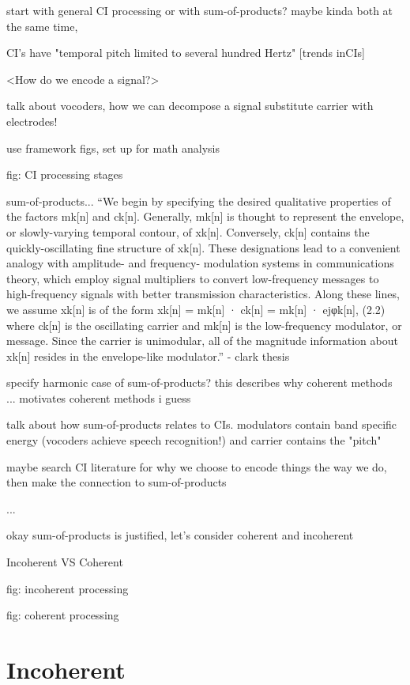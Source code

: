 \documentclass [11pt, proquest] {uwthesis}[2015/03/03]
\begin{document}
start with general CI processing or with sum-of-products?
maybe kinda both at the same time,

CI's have "temporal pitch limited to several hundred Hertz" [trends inCIs]

<How do we encode a signal?>

talk about vocoders, how we can decompose a signal
substitute carrier with electrodes!

use framework figs, set up for math analysis

fig: CI processing stages

sum-of-products...
``We begin by specifying the desired qualitative properties of the factors mk[n] and ck[n]. Generally, mk[n] is thought to represent the envelope, or slowly-varying temporal contour, of xk[n]. Conversely, ck[n] contains the quickly-oscillating fine structure of xk[n]. These designations lead to a convenient analogy with amplitude- and frequency- modulation systems in communications theory, which employ signal multipliers to convert low-frequency messages to high-frequency signals with better transmission characteristics. Along these lines, we assume xk[n] is of the form
xk[n] = mk[n] · ck[n] = mk[n] · ejφk[n], (2.2)
where ck[n] is the oscillating carrier and mk[n] is the low-frequency modulator, or message. Since the carrier is unimodular, all of the magnitude information about xk[n] resides in the envelope-like modulator.'' - clark thesis

specify harmonic case of sum-of-products? this describes why coherent methods ... motivates coherent methods i guess

talk about how sum-of-products relates to CIs.  modulators contain band specific energy (vocoders achieve speech recognition!) and carrier contains the "pitch"

maybe search CI literature for why we choose to encode things the way we do, then make the connection to sum-of-products

...

okay sum-of-products is justified, let's consider coherent and incoherent

Incoherent VS Coherent

fig: incoherent processing

fig: coherent processing

\section{Incoherent}
\end{document}
